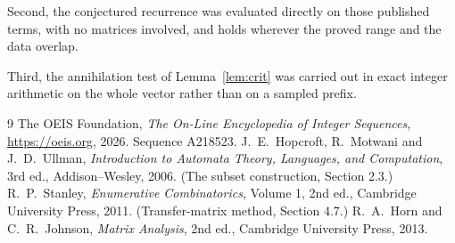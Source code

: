 \documentclass[11pt,a4paper]{article}
\theoremstyle{plain}
\theoremstyle{definition}
\begin{document}
Second, the conjectured recurrence was evaluated directly on those published terms, with no
matrices involved, and holds wherever the proved range and the data overlap.

Third, the annihilation test of Lemma~\ref{lem:crit} was carried out in exact integer
arithmetic on the whole vector rather than on a sampled prefix.

\begin{thebibliography}{9}
 The OEIS Foundation, \emph{The On-Line Encyclopedia of Integer
Sequences}, \url{https://oeis.org}, 2026. Sequence A218523.
 J.~E.~Hopcroft, R.~Motwani and J.~D.~Ullman, \emph{Introduction to Automata
Theory, Languages, and Computation}, 3rd ed., Addison--Wesley, 2006. (The subset
construction, Section 2.3.)
 R.~P.~Stanley, \emph{Enumerative Combinatorics}, Volume 1, 2nd ed.,
Cambridge University Press, 2011. (Transfer-matrix method, Section 4.7.)
 R.~A.~Horn and C.~R.~Johnson, \emph{Matrix Analysis}, 2nd ed., Cambridge
University Press, 2013.
\end{thebibliography}
\end{document}
